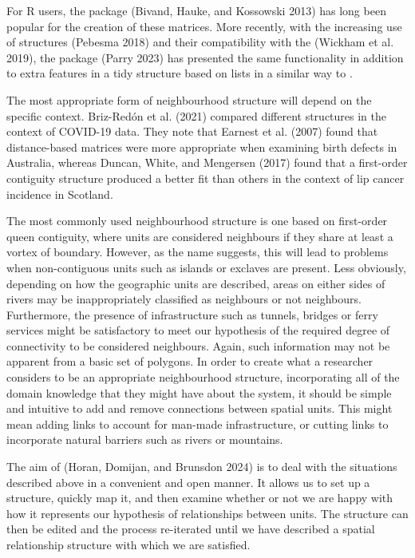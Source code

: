 For R users, the  package (Bivand, Hauke, and Kossowski 2013) has long been popular for the
creation of these matrices. More recently, with the increasing use of  structures (Pebesma 2018) and their compatibility with the  (Wickham et al. 2019), the  package (Parry 2023) has presented the same
functionality in addition to extra features in a tidy structure based on
lists in a similar way to .

The most appropriate form of neighbourhood structure will depend on the specific context. Briz-Redón et al. (2021) compared different structures in the context of COVID-19 data. They note that Earnest et al. (2007) found that distance-based matrices were more appropriate when examining birth defects in Australia, whereas Duncan, White, and Mengersen (2017) found that a first-order contiguity structure produced a better fit than others in the context of lip cancer incidence in Scotland.

The most commonly used neighbourhood structure is one based on first-order queen contiguity, where units are considered neighbours if they
share at least a vortex of boundary. However, as the name suggests, this
will lead to problems when non-contiguous units such as islands or
exclaves are present. Less obviously, depending on how the geographic
units are described, areas on either sides of rivers may be
inappropriately classified as neighbours or not neighbours. Furthermore,
the presence of infrastructure such as tunnels, bridges or ferry
services might be satisfactory to meet our hypothesis of the required
degree of connectivity to be considered neighbours. Again, such information may not be apparent from a basic set of polygons. In order to create what a researcher considers to be an appropriate neighbourhood structure, incorporating all of the domain knowledge that they might have about the system, it should be simple and intuitive to add and remove connections between spatial units. This might mean adding links to account for man-made infrastructure, or cutting links to incorporate natural barriers such as rivers or mountains.

The aim of  (Horan, Domijan, and Brunsdon 2024) is to deal with the situations described above in a
convenient and open manner. It allows us to set up a structure, quickly
map it, and then examine whether or not we are happy with how it represents our hypothesis of relationships between units. The structure can then be edited and the process re-iterated until we have described a
spatial relationship structure with which we are satisfied.

